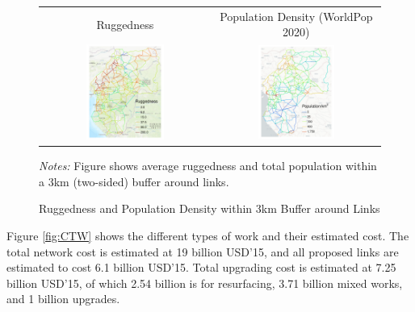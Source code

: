 \documentclass[a4paper]{article}
\begin{document}
\begin{figure}[H] \vspace{-1mm}
\centering
\caption{\label{fig:RUGG_POP} Ruggedness and Population Density within 3km Buffer around Links}
\vspace{2mm}
\begin{tabular}{cc}
Ruggedness \citep{nunn2012ruggedness} & Population Density (WorldPop 2020) \\
\includegraphics[width=0.48\textwidth]{"../figures/trans_CEMAC_network_rugg.pdf"} &
\includegraphics[width=0.48\textwidth]{"../figures/trans_CEMAC_network_pop_wpop_km2.pdf"} \\ [-0.2em]
\end{tabular}
\scriptsize 
\emph{Notes:} Figure shows average ruggedness and total population within a 3km (two-sided) buffer around links.
\end{figure}

Figure \ref{fig:CTW} shows the different types of work and their estimated cost. The total network cost is estimated at 19 billion USD'15, and all proposed links are estimated to cost 6.1 billion USD'15. Total upgrading cost is estimated at 7.25 billion USD'15, of which 2.54 billion is for resurfacing, 3.71 billion mixed works, and 1 billion upgrades. 
\end{document}
